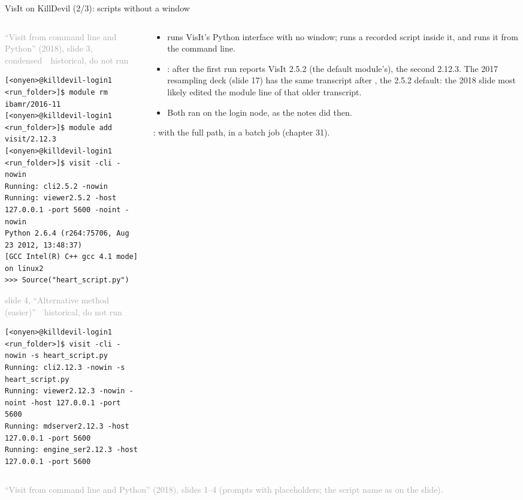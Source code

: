 \documentclass[aspectratio=169,11pt]{beamer}
\newcommand{\sourcecredit}[1]{\vfill\begin{flushright}\tiny\textcolor{DarkGray}{#1}\end{flushright}}
\newcommand{\hist}[1]{{\tiny\sffamily\textcolor{DarkGray}{#1\ \textbullet\ historical, do not run}}\par\nointerlineskip\vspace{0.3mm}}
\begin{document}
\begin{frame}[fragile]{VisIt on KillDevil (2/3): scripts without a window}
\label{fr:visitcli}
\begin{columns}[T,onlytextwidth]
\begin{column}{0.52\textwidth}
\hist{``Visit from command line and Python'' (2018), slide 3, condensed}
\begin{lstlisting}[style=hist]
[<onyen>@killdevil-login1 <run_folder>]$ module rm ibamr/2016-11
[<onyen>@killdevil-login1 <run_folder>]$ module add visit/2.12.3
[<onyen>@killdevil-login1 <run_folder>]$ visit -cli -nowin
Running: cli2.5.2 -nowin
Running: viewer2.5.2 -host 127.0.0.1 -port 5600 -noint -nowin
Python 2.6.4 (r264:75706, Aug 23 2012, 13:48:37)
[GCC Intel(R) C++ gcc 4.1 mode] on linux2
>>> Source("heart_script.py")
\end{lstlisting}
\hist{slide 4, ``Alternative method (easier)''}
\begin{lstlisting}[style=hist]
[<onyen>@killdevil-login1 <run_folder>]$ visit -cli -nowin -s heart_script.py
Running: cli2.12.3 -nowin -s heart_script.py
Running: viewer2.12.3 -nowin -noint -host 127.0.0.1 -port 5600
Running: mdserver2.12.3 -host 127.0.0.1 -port 5600
Running: engine_ser2.12.3 -host 127.0.0.1 -port 5600
\end{lstlisting}
\end{column}
\begin{column}{0.45\textwidth}
\footnotesize
\begin{itemize}\setlength{\itemsep}{2pt}
  \item {} runs VisIt's Python interface with no window;  runs a recorded script inside it, and  runs it from the command line.
  \item {}: after  the first run reports VisIt 2.5.2 (the default module's), the second 2.12.3. The 2017 resampling deck (slide 17) has the same transcript after , the 2.5.2 default: the 2018 slide most likely edited the module line of that older transcript.
  \item Both ran on the login node, as the notes did then.
\end{itemize}
\vspace{1mm}
:  with the full path, in a batch job (chapter 31).
\end{column}
\end{columns}
\sourcecredit{``Visit from command line and Python'' (2018), slides 1--4 (prompts with placeholders; the script name as on the slide).}
\end{frame}
\end{document}
